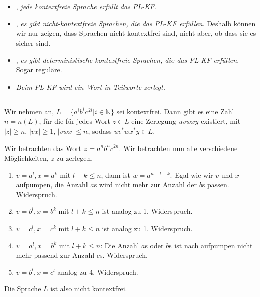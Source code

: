 \documentclass{article}
\begin{document}
\section{}%
\subsection{}%
\begin{itemize}
	\item {}, \emph{jede kontextfreie Sprache erfüllt das PL-KF}. 
  \item {}, \emph{es gibt nicht-kontextfreie Sprachen, die das PL-KF erfüllen}. Deshalb können wir nur zeigen, dass Sprachen nicht kontextfrei sind, nicht aber, ob dass sie es sicher sind.
  \item {}, \emph{es gibt deterministische kontextfreie Sprachen, die das PL-KF erfüllen}. Sogar reguläre.
  \item \emph{Beim PL-KF wird ein Wort in  Teilworte zerlegt.}
\end{itemize}

\subsection{}%
Wir nehmen an, $L=\{a^ib^ic^{2i} | i \in \mathbb{N}\}$ sei kontextfrei. Dann gibt es eine Zahl $n = n(L)$, für die für jedes Wort $z \in L$ eine Zerlegung $uvwxy$ existiert, mit $|z|\geq n$, $|vx|\geq 1$, $|vwx| \leq n$, sodass $uv^*wx^*y \in L$.

Wir betrachten das Wort $z = a^nb^nc^{2n}$. Wir betrachten nun alle verschiedene Möglichkeiten, $z$ zu zerlegen.
\begin{enumerate}
	\item $v = a^l, x = a^k$ mit $l + k \leq n$, dann ist $w = a^{n-l-k}$. Egal wie wir $v$ und $x$ aufpumpen, die Anzahl $a$s wird nicht mehr zur Anzahl der $b$s passen. Widerspruch.
  \item $v = b^l, x = b^k$ mit $l + k \leq n$ ist analog zu 1. Widerspruch.
  \item $v = c^l, x = c^k$ mit $l + k \leq n$ ist analog zu 1. Widerspruch.
  \item $v = a^l, x = b^k$ mit $l + k \leq n$: Die Anzahl $a$s oder $b$s ist nach aufpumpen nicht mehr passend zur Anzahl $c$s. Widerspruch.
  \item $v = b^l, x = c^l$ analog zu 4. Widerspruch.
\end{enumerate}
Die Sprache $L$ ist also nicht kontextfrei.
\end{document}
